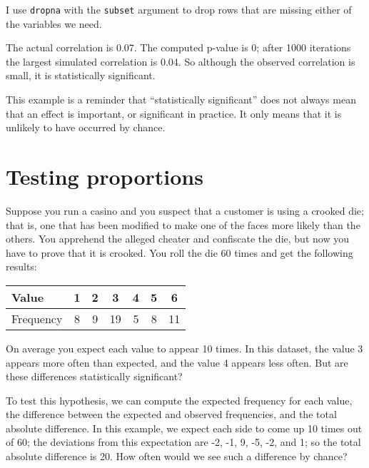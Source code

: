 I use {\tt dropna} with the {\tt subset} argument to drop rows
that are missing either of the variables we need.

The actual correlation is 0.07.  The computed p-value is 0; after 1000
iterations the largest simulated correlation is 0.04.  So although the
observed correlation is small, it is statistically significant.
   

This example is a reminder that ``statistically significant'' does not
always mean that an effect is important, or significant in practice.
It only means that it is unlikely to have occurred by chance.


\section{Testing proportions}
\label{casino}

Suppose you run a casino and you suspect that a customer is
using a crooked die; that
is, one that has been modified to make one of the faces more
likely than the others.  You apprehend the alleged
cheater and confiscate the die, but now you have to prove that it
is crooked.  You roll the die 60 times and get the following results:

\begin{center}
\begin{tabular}{|l|c|c|c|c|c|c|}
\hline
Value     &  1  &  2  &  3  &  4  &  5  &  6  \\ 
\hline
Frequency &  8  &  9  &  19  &  5  &  8  &  11  \\
\hline
\end{tabular}
\end{center}

On average you expect each value to appear 10 times.  In this
dataset, the value 3 appears more often than expected, and the value 4
appears less often.  But are these differences statistically
significant?
   

To test this hypothesis, we can compute the expected frequency for
each value, the difference between the expected and observed
frequencies, and the total absolute difference.  In this
example, we expect each side to come up 10 times out of 60; the
deviations from this expectation are -2, -1, 9, -5, -2, and 1; so the
total absolute difference is 20.  How often would we see such a
difference by chance?

